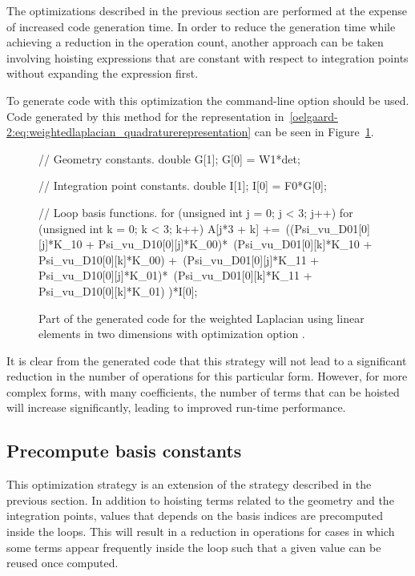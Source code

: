 The optimizations described in the previous section are performed at
the expense of increased code generation time.  In order to reduce the
generation time while achieving a reduction in the operation count,
another approach can be taken involving hoisting expressions that are
constant with respect to integration points without expanding the
expression first.

To generate code with this optimization the \ffc{} command-line option
 should be used.  Code generated by this
method for the representation
in~\eqref{oelgaard-2:eq:weightedlaplacian_quadraturerepresentation}
can be seen in \hbox{Figure}~\ref{oelgaard-2:fig:O_ip_code}.

\begin{figure}
\bwfig
\begin{c++}
// Geometry constants.
double G[1];
G[0] = W1*det;

// Integration point constants.
double I[1];
I[0] = F0*G[0];

// Loop basis functions.
for (unsigned int j = 0; j < 3; j++)
{
  for (unsigned int k = 0; k < 3; k++)
  {
    A[j*3 + k] +=\
    ((Psi_vu_D01[0][j]*K_10 + Psi_vu_D10[0][j]*K_00)*\
     (Psi_vu_D01[0][k]*K_10 + Psi_vu_D10[0][k]*K_00) +\
     (Psi_vu_D01[0][j]*K_11 + Psi_vu_D10[0][j]*K_01)*\
     (Psi_vu_D01[0][k]*K_11 + Psi_vu_D10[0][k]*K_01)
    )*I[0];
  }
}
\end{c++}
\caption{Part of the generated code for the weighted Laplacian using
  linear elements in two dimensions with optimization option .}
\label{oelgaard-2:fig:O_ip_code}
\end{figure}

It is clear from the generated code that this strategy will not lead
to a significant reduction in the number of operations for this
particular form. However, for more complex forms, with many
coefficients, the number of terms that can be hoisted will increase
significantly, leading to improved run-time performance.\enlargethispage{12pt}

\subsection{Precompute basis constants}

This optimization strategy is an extension of the strategy described
in the previous section. In addition to hoisting terms related to the
geometry and the integration points, values that depends on the basis
indices are precomputed inside the loops.  This will result in a
reduction in operations for cases in which some terms appear
frequently inside the loop such that a given value can be reused once
computed.

